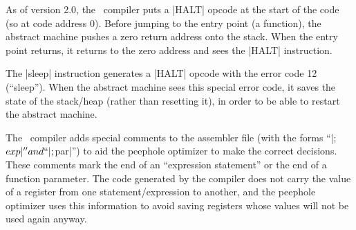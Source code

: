 \list{\lbullet}
  As of version 2.0, the \Small\ compiler puts a |HALT| opcode at the start of
  the code (so at code address 0). Before jumping to the entry point (a
  function), the abstract machine pushes a zero return address onto the stack.
  When the entry point returns, it returns to the zero address and sees the
  |HALT| instruction.

\list{\lbullet}
  The |sleep| instruction generates a |HALT| opcode with the error code 12
  (``sleep''). When the abstract machine sees this special error code, it saves
  the state of the stack\slash heap (rather than resetting it), in order to
  be able to restart the abstract machine.

\list{\lbullet}
   
  The \Small\ compiler adds special comments to the assembler file (with the forms
  ``|;$exp|'' and ``|;$par|'') to aid the peephole optimizer to make the correct
  decisions. These comments mark the end of an ``expression statement'' or the
  end of a function parameter. The code generated by the compiler does not carry
  the value of a register from one statement\slash expression to another, and
  the peephole optimizer uses this information to avoid saving registers whose
  values will not be used again anyway.

\endlist


